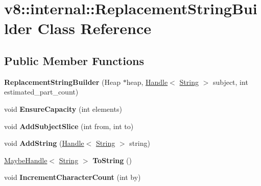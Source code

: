 \hypertarget{classv8_1_1internal_1_1_replacement_string_builder}{}\section{v8\+:\+:internal\+:\+:Replacement\+String\+Builder Class Reference}
\label{classv8_1_1internal_1_1_replacement_string_builder}
\subsection*{Public Member Functions}
\begin{DoxyCompactItemize}
\item 
\hypertarget{classv8_1_1internal_1_1_replacement_string_builder_aa6ed9782d2325a8fdd46a6e15393eece}{}{\bfseries Replacement\+String\+Builder} (Heap $\ast$heap, \hyperlink{classv8_1_1internal_1_1_handle}{Handle}$<$ \hyperlink{classv8_1_1internal_1_1_string}{String} $>$ subject, int estimated\+\_\+part\+\_\+count)\label{classv8_1_1internal_1_1_replacement_string_builder_aa6ed9782d2325a8fdd46a6e15393eece}

\item 
\hypertarget{classv8_1_1internal_1_1_replacement_string_builder_aa9308f62a984d9fd648403128ed0118f}{}void {\bfseries Ensure\+Capacity} (int elements)\label{classv8_1_1internal_1_1_replacement_string_builder_aa9308f62a984d9fd648403128ed0118f}

\item 
\hypertarget{classv8_1_1internal_1_1_replacement_string_builder_ae8334fc56c55ed336a2a1d14b2fab3f5}{}void {\bfseries Add\+Subject\+Slice} (int from, int to)\label{classv8_1_1internal_1_1_replacement_string_builder_ae8334fc56c55ed336a2a1d14b2fab3f5}

\item 
\hypertarget{classv8_1_1internal_1_1_replacement_string_builder_a18e4204c090838012e9cca169c7302b6}{}void {\bfseries Add\+String} (\hyperlink{classv8_1_1internal_1_1_handle}{Handle}$<$ \hyperlink{classv8_1_1internal_1_1_string}{String} $>$ string)\label{classv8_1_1internal_1_1_replacement_string_builder_a18e4204c090838012e9cca169c7302b6}

\item 
\hypertarget{classv8_1_1internal_1_1_replacement_string_builder_a870c66139d856e767c021e1461516ab0}{}\hyperlink{classv8_1_1internal_1_1_maybe_handle}{Maybe\+Handle}$<$ \hyperlink{classv8_1_1internal_1_1_string}{String} $>$ {\bfseries To\+String} ()\label{classv8_1_1internal_1_1_replacement_string_builder_a870c66139d856e767c021e1461516ab0}

\item 
\hypertarget{classv8_1_1internal_1_1_replacement_string_builder_ac6b4287222a6e168b84cba200a290910}{}void {\bfseries Increment\+Character\+Count} (int by)\label{classv8_1_1internal_1_1_replacement_string_builder_ac6b4287222a6e168b84cba200a290910}

\end{DoxyCompactItemize}
